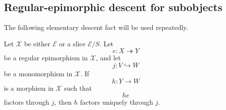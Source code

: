 \subsection{Regular-epimorphic descent for subobjects}
\label{subsec:regular-epi-descent-subobjects}

The following elementary descent fact will be used repeatedly.

\begin{lemma}
\label{lem:regular-epi-descent-for-subobjects-membership}
    Let \(\mathcal X\) be either \(\mathcal E\) or a slice
    \(\mathcal E/S\). Let
    \[
        e:X\twoheadrightarrow Y
    \]
    be a regular epimorphism in \(\mathcal X\), and let
    \[
        j:V\hookrightarrow W
    \]
    be a monomorphism in \(\mathcal X\). If
    \[
        h:Y\to W
    \]
    is a morphism in \(\mathcal X\) such that
    \[
        he
    \]
    factors through \(j\), then \(h\) factors uniquely through \(j\).
\end{lemma}

